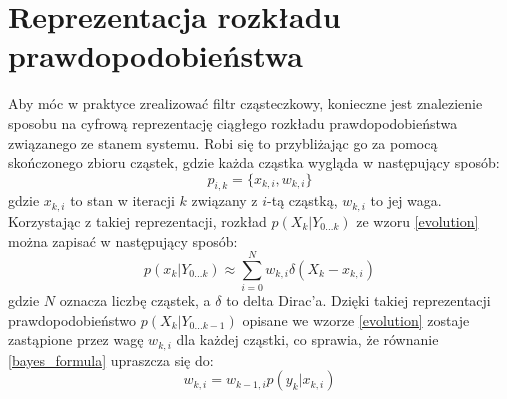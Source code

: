\section{Reprezentacja rozkładu prawdopodobieństwa}
Aby móc w praktyce zrealizować filtr cząsteczkowy, konieczne jest znalezienie sposobu na cyfrową reprezentację ciągłego rozkładu prawdopodobieństwa związanego ze stanem systemu. Robi się to przybliżając go za pomocą skończonego zbioru cząstek, gdzie każda cząstka wygląda w następujący sposób:
\begin{equation*}
	p_{i,k}=\{x_{k,i},w_{k,i}\}
\end{equation*}
gdzie $x_{k,i}$ to stan w iteracji $k$ związany z $i$-tą cząstką, $w_{k,i}$ to jej waga. Korzystając z takiej reprezentacji, rozkład $p(X_k|Y_{0...k})$ ze wzoru \ref{evolution} można zapisać w następujący sposób:
\begin{equation}
	p(x_k|Y_{0...k})\approx \sum_{i=0}^{N} w_{k,i}	\delta(X_k-x_{k,i})
\end{equation}
gdzie $N$ oznacza liczbę cząstek, a $\delta$ to delta Dirac'a. Dzięki takiej reprezentacji prawdopodobieństwo $p(X_k|Y_{0...k-1})$ opisane we wzorze \ref{evolution} zostaje zastąpione przez wagę $w_{k,i}$ dla każdej cząstki, co sprawia, że równanie \ref{bayes_formula} upraszcza się do:
\begin{equation}\label{weight_update}
	w_{k,i} = w_{k-1,i} p(y_k|x_{k,i})
\end{equation}


